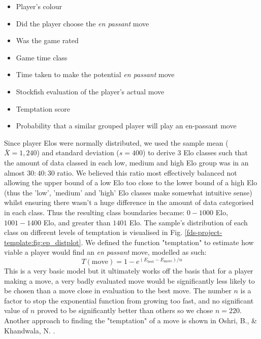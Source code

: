 \documentclass[10pt,a4paper]{article}
\begin{document}
\begin{multicols}{2}
\begin{itemize}
\addtolength\itemsep{-2.5mm}
  \item Player's colour
  \item Did the player choose the \textit{en passant} move
  \item Was the game rated
  \item Game time class
  \item Time taken to make the potential \textit{en passant} move
  \item Stockfish evaluation of the player's actual move
  \item Temptation score
  \item Probability that a similar grouped player will play an en-passant move
\end{itemize}

Since player Elos were normally distributed, we used the sample mean ($\bar{X} = 1,240$) and standard deviation ($s = 400$) to derive $3$ Elo classes such that the amount of data classed in each low, medium and high Elo group was in an almost $30:40:30$ ratio. We believed this ratio most effectively balanced not allowing the upper bound of a low Elo too close to the lower bound of a high Elo (thus the 'low', 'medium' and 'high' Elo classes make somewhat intuitive sense) whilst ensuring there wasn't a huge difference in the amount of data categorised in each class. Thus the resulting class boundaries became: $0 - 1000$ Elo, $1001 - 1400$ Elo, and greater than $1401$ Elo. The sample's distribution of each class on different levels of temptation is visualised in Fig. \ref{fds-project-template:fig:ep_distplot}. We defined the function "temptation" to estimate how viable a player would find an \textit{en passant} move, modelled as such:
$$T(\text{move})= 1 -e^{(E_{\text{best}} - E_{\text{move}})/{n}}$$
This is a very basic model but it ultimately works off the basis that for a player making a move, a very badly evaluated move would be significantly less likely to be chosen than a move close in evaluation to the best move. The number $n$ is a factor to stop the exponential function from growing too fast, and no significant value of $n$ proved to be significantly better than others so we chose $n=220$. Another approach to finding the "temptation" of a move is shown in Oshri, B., \& Khandwala, N. \cite{mcilroy2022learning}.\newline


\end{multicols}
\end{document}
